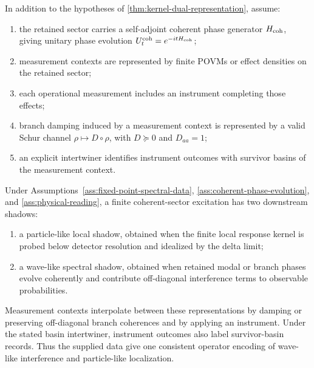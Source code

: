 \documentclass[11pt]{article}
\begin{document}
\begin{assumption}
\label{ass:physical-reading}
In addition to the hypotheses of \cref{thm:kernel-dual-representation}, assume:
\begin{enumerate}[label=(\roman*)]
  \item the retained sector carries a self-adjoint coherent phase generator \(H_{\rm coh}\),
  giving unitary phase evolution \(U_t^{\rm coh}=e^{-itH_{\rm coh}}\);
  \item measurement contexts are represented by finite POVMs or effect densities on the
  retained sector;
  \item each operational measurement includes an instrument completing those effects;
  \item branch damping induced by a measurement context is represented by a valid Schur
  channel \(\rho\mapsto D\circ\rho\), with \(D\succeq0\) and \(D_{aa}=1\);
  \item an explicit intertwiner identifies instrument outcomes with survivor basins of the
  measurement context.
\end{enumerate}
\end{assumption}

\begin{theorem}
\label{thm:wave-particle-projection-duality}
Under Assumptions~\ref{ass:fixed-point-spectral-data},
\ref{ass:coherent-phase-evolution}, and
\ref{ass:physical-reading},
a finite coherent-sector excitation has two downstream shadows:
\begin{enumerate}[label=(\roman*)]
  \item a particle-like local shadow, obtained when the finite local response kernel is probed
  below detector resolution and idealized by the delta limit;
  \item a wave-like spectral shadow, obtained when retained modal or branch phases evolve
  coherently and contribute off-diagonal interference terms to observable probabilities.
\end{enumerate}
Measurement contexts interpolate between these representations by damping or preserving
off-diagonal branch coherences and by applying an instrument. Under the stated basin
intertwiner, instrument outcomes also label survivor-basin records. Thus the supplied data
give one consistent operator encoding of wave-like interference and particle-like localization.
\end{theorem}
\end{document}
